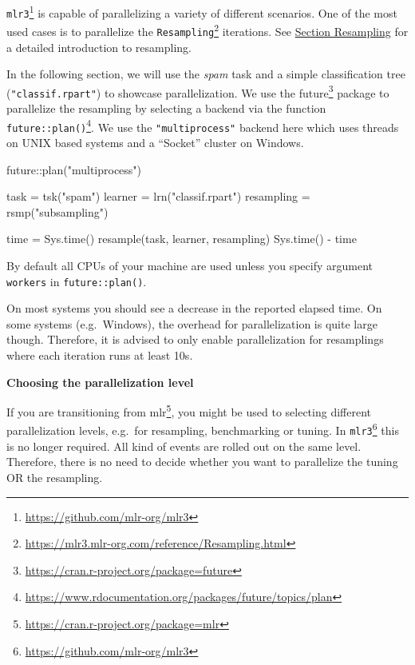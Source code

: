 \documentclass[12pt,]{scrbook}
\makeatletter
\newenvironment{Shaded}{}{}
\newcommand{\KeywordTok}[1]{\textcolor[rgb]{0.00,0.00,1.00}{#1}}
\newcommand{\NormalTok}[1]{#1}
\newcommand{\OperatorTok}[1]{#1}
\newcommand{\StringTok}[1]{\textcolor[rgb]{0.00,0.50,0.50}{#1}}
\renewcommand{\href}[2]{#2\footnote{\url{#1}}}
\newenvironment{kframe}{%
\medskip{}
\setlength{\fboxsep}{.8em}
 \def\at@end@of@kframe{}%
 \ifinner\ifhmode%
  \def\at@end@of@kframe{\end{minipage}}%
  \begin{minipage}{\columnwidth}%
 \fi\fi%
 \def\FrameCommand##1{\hskip\@totalleftmargin \hskip-\fboxsep
 \colorbox{shadecolor}{##1}\hskip-\fboxsep
     \hskip-\linewidth \hskip-\@totalleftmargin \hskip\columnwidth}%
 \MakeFramed {\advance\hsize-\width
   \@totalleftmargin\z@ \linewidth\hsize
   \@setminipage}}%
 {\par\unskip\endMakeFramed%
 \at@end@of@kframe}
\newenvironment{rmdblock}[1]
  {
  \begin{itemize}
  \renewcommand{\labelitemi}{
    \raisebox{-.7\height}[0pt][0pt]{
      {\setkeys{Gin}{width=3em,keepaspectratio}\texttt{[image: images/\#1]}}
    }
  }
  \setlength{\fboxsep}{1em}
  \begin{kframe}
  \item
  }
  {
  \end{kframe}
  \end{itemize}
  }
\newenvironment{caution}
  {\begin{rmdblock}{caution}}
  {\end{rmdblock}}
\makeatother
\begin{document}
\href{https://github.com/mlr-org/mlr3}{\texttt{mlr3}} is capable of parallelizing a variety of different scenarios.
One of the most used cases is to parallelize the \href{https://mlr3.mlr-org.com/reference/Resampling.html}{\texttt{Resampling}} iterations.
See \protect\hyperlink{resampling}{Section Resampling} for a detailed introduction to resampling.

In the following section, we will use the \emph{spam} task and a simple classification tree (\texttt{"classif.rpart"}) to showcase parallelization.
We use the \href{https://cran.r-project.org/package=future}{future} package to parallelize the resampling by selecting a backend via the function \href{https://www.rdocumentation.org/packages/future/topics/plan}{\texttt{future::plan()}}.
We use the \texttt{"multiprocess"} backend here which uses threads on UNIX based systems and a ``Socket'' cluster on Windows.

\begin{Shaded}
\begin{Highlighting}[]
\NormalTok{future}\OperatorTok{::}\KeywordTok{plan}\NormalTok{(}\StringTok{"multiprocess"}\NormalTok{)}

\NormalTok{task =}\StringTok{ }\KeywordTok{tsk}\NormalTok{(}\StringTok{"spam"}\NormalTok{)}
\NormalTok{learner =}\StringTok{ }\KeywordTok{lrn}\NormalTok{(}\StringTok{"classif.rpart"}\NormalTok{)}
\NormalTok{resampling =}\StringTok{ }\KeywordTok{rsmp}\NormalTok{(}\StringTok{"subsampling"}\NormalTok{)}

\NormalTok{time =}\StringTok{ }\KeywordTok{Sys.time}\NormalTok{()}
\KeywordTok{resample}\NormalTok{(task, learner, resampling)}
\KeywordTok{Sys.time}\NormalTok{() }\OperatorTok{-}\StringTok{ }\NormalTok{time}
\end{Highlighting}
\end{Shaded}

\begin{caution}
By default all CPUs of your machine are used unless you specify argument
\texttt{workers} in \texttt{future::plan()}.
\end{caution}

On most systems you should see a decrease in the reported elapsed time.
On some systems (e.g.~Windows), the overhead for parallelization is quite large though.
Therefore, it is advised to only enable parallelization for resamplings where each iteration runs at least 10s.

\textbf{Choosing the parallelization level}

If you are transitioning from \href{https://cran.r-project.org/package=mlr}{mlr}, you might be used to selecting different parallelization levels, e.g.~for resampling, benchmarking or tuning.
In \href{https://github.com/mlr-org/mlr3}{\texttt{mlr3}} this is no longer required.
All kind of events are rolled out on the same level.
Therefore, there is no need to decide whether you want to parallelize the tuning OR the resampling.
\end{document}

